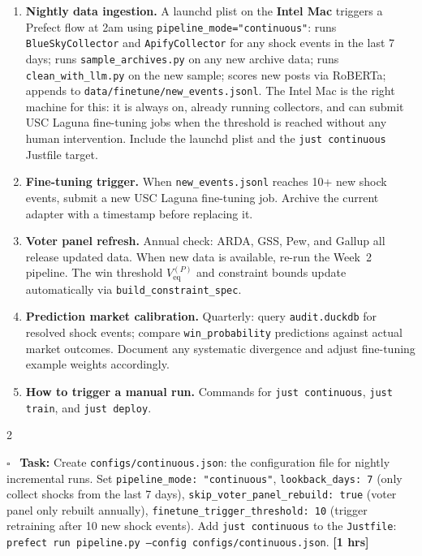 \documentclass[11pt]{article}
\newcommand{\hrs}[1]{\textbf{[#1 hrs]}}
\newcommand{\veq}{V_{\mathrm{eq}}}
\newcommand{\task}[2]{%
  \noindent\textbf{Task:} #1 \hfill \hrs{#2}\\}
\newcommand{\done}{\textcolor{sectionblue}{$\square$}\ }
\begin{document}
\begin{taskbox}
{  \begin{enumerate}[leftmargin=1.6em, itemsep=2pt]
    \item \textbf{Nightly data ingestion.} A launchd plist on the
          \textbf{Intel Mac} triggers a Prefect flow at 2am using
          \texttt{pipeline\_mode="continuous"}: runs \texttt{BlueSkyCollector}
          and \texttt{ApifyCollector} for any shock events in the last 7 days;
          runs \texttt{sample\_archives.py} on any new archive data;
          runs \texttt{clean\_with\_llm.py} on the new sample;
          scores new posts via RoBERTa; appends to
          \texttt{data/finetune/new\_events.jsonl}. The Intel Mac is the right
          machine for this: it is always on, already running collectors, and
          can submit USC Laguna fine-tuning jobs when the threshold is reached without
          any human intervention. Include the launchd plist and the
          \texttt{just continuous} Justfile target.
    \item \textbf{Fine-tuning trigger.} When \texttt{new\_events.jsonl} reaches
          10+ new shock events, submit a new USC Laguna fine-tuning job. Archive the
          current adapter with a timestamp before replacing it.
    \item \textbf{Voter panel refresh.} Annual check: ARDA, GSS, Pew, and Gallup
          all release updated data. When new data is available, re-run the
          Week~2 pipeline. The win threshold $\veq^{(P)}$ and constraint bounds
          update automatically via \texttt{build\_constraint\_spec}.
    \item \textbf{Prediction market calibration.} Quarterly: query
          \texttt{audit.duckdb} for resolved shock events; compare
          \texttt{win\_probability} predictions against actual market outcomes.
          Document any systematic divergence and adjust fine-tuning example
          weights accordingly.
    \item \textbf{How to trigger a manual run.} Commands for \texttt{just
          continuous}, \texttt{just train}, and \texttt{just deploy}.
  \end{enumerate}}{2}

\done \task{Create \texttt{configs/continuous.json}: the configuration file for
  nightly incremental runs. Set \texttt{pipeline\_mode: "continuous"},
  \texttt{lookback\_days: 7} (only collect shocks from the last 7 days),
  \texttt{skip\_voter\_panel\_rebuild: true} (voter panel only rebuilt
  annually), \texttt{finetune\_trigger\_threshold: 10} (trigger retraining
  after 10 new shock events). Add \texttt{just continuous} to the
  \texttt{Justfile}: \texttt{prefect run pipeline.py --config
  configs/continuous.json}.}{1}


\end{taskbox}
\end{document}
